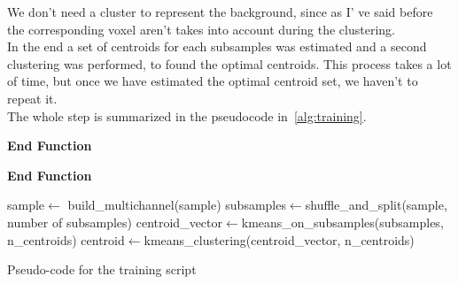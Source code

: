 	
	We don't need a cluster to represent the background, since as I' ve said before the corresponding voxel aren't takes into account during the clustering.\\
	In the end a set of centroids for each subsamples was estimated and a second clustering was performed, to found the optimal centroids. 
	This process takes a lot of time, but once we have estimated the optimal centroid set, we haven't to repeat it.\\
	
	The whole step is summarized in the pseudocode in \figurename\,\ref{alg:training}.
		
		
	\begin{algorithm}
	
	\SetAlgoLined
	\DontPrintSemicolon
	
	
	\textbf{End Function}

	\textbf{End Function}
	
	

	sample$\leftarrow$ build\_multichannel(sample)\;
	subsamples$\leftarrow$shuffle\_and\_split(sample, number of subsamples)\;
	centroid\_vector$\leftarrow$kmeans\_on\_subsamples(subsamples, n\_centroids)\;
	centroid$\leftarrow$kmeans\_clustering(centroid\_vector, n\_centroids)\;
	
	\caption{Pseudo-code for the training script}\label{alg:training}
	
\end{algorithm}

	
